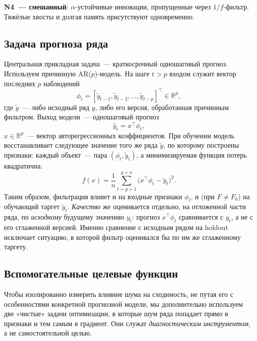\documentclass[conference]{IEEEtran}
\begin{document}
\textbf{N4~--- смешанный}: $\alpha$-устойчивые инновации, пропущенные через
$1/f$-фильтр. Тяжёлые хвосты и долгая память присутствуют одновременно.

\subsection{Задача прогноза ряда}
\label{sec:forecast}

Центральная прикладная задача~--- краткосрочный одношаговый прогноз.
Используем причинную AR($p$)-модель. На шаге $t>p$ входом служит вектор
последних $p$ наблюдений
\begin{equation}
  \phi_t = [\tilde y_{t-1}, \tilde y_{t-2}, \dots, \tilde y_{t-p}]^\top
  \in \mathbb{R}^{p},
  \label{eq:ar_input}
\end{equation}
где $\tilde y$~--- либо исходный ряд $y$, либо его версия, обработанная
причинным фильтром. Выход модели~--- одношаговый прогноз
\begin{equation}
  \hat y_t = x^\top \phi_t,
  \label{eq:ar_output}
\end{equation}
$x\in\mathbb{R}^{p}$~--- вектор авторегрессионных коэффициентов. При
обучении модель восстанавливает следующее значение того же ряда
$\tilde y$, по которому построены признаки: каждый объект~--- пара
$(\phi_t, \tilde y_t)$, а минимизируемая функция потерь квадратична:
\begin{equation}
  f(x)=\frac{1}{n}\sum_{t=p+1}^{p+n}\bigl(x^\top \phi_t - \tilde y_t\bigr)^2.
  \label{eq:ar_loss}
\end{equation}
Таким образом, фильтрация влияет и на входные признаки $\phi_t$, и (при
$F\neq F_0$) на обучающий таргет $\tilde y_t$. \emph{Качество} же
оценивается отдельно, на отложенной части ряда, по \emph{исходному}
будущему значению $y_t$: прогноз $x^\top\phi_t$ сравнивается с $y_t$, а не
с его сглаженной версией. Именно сравнение с исходным рядом на holdout
исключает ситуацию, в которой фильтр оценивался бы по им же сглаженному
таргету.

\subsection{Вспомогательные целевые функции}
\label{sec:aux}

Чтобы изолированно измерить влияние шума на сходимость, не путая его с
особенностями конкретной прогнозной модели, мы дополнительно используем
две «чистые» задачи оптимизации, в которые шум ряда попадает прямо в
признаки и тем самым в градиент. Они служат \emph{диагностическим
инструментом}, а не самостоятельной целью.
\end{document}
